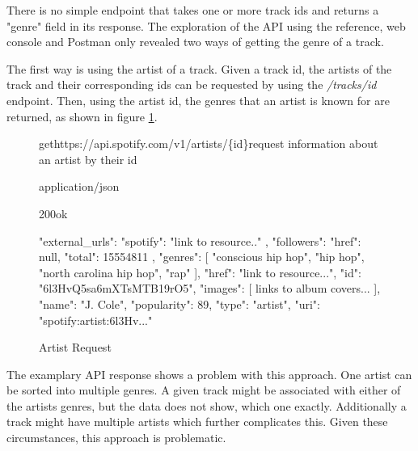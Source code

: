 There is no simple endpoint that takes one or more track ids and returns  a "genre" field
in its response. The exploration of the API using the reference, web console and Postman only revealed
two ways of getting the genre of a track. 

The first way is using the artist of a track. Given a track id, the artists of the track and their corresponding
ids can be requested by using the \emph{/tracks/{id}} endpoint. Then, using the artist id, the genres that an
artist is known for are returned, as shown in figure \ref{fig:Artist Request}.

\begin{figure}[H]
    \caption{Artist Request}
	\label{fig:Artist Request}
\begin{apiRoute}{get}{https://api.spotify.com/v1/artists/\{id\}}{request information about an artist by their id}
    \begin{routeParameter}
    \end{routeParameter}
    \begin{routeResponse}{application/json}
        \begin{routeResponseItem}{200}{ok}
            \begin{routeResponseItemBody}
{
    "external_urls": {
        "spotify": "link to resource.."
    },
    "followers": {
        "href": null,
        "total": 15554811
    },
    "genres": [
        "conscious hip hop",
        "hip hop",
        "north carolina hip hop",
        "rap"
    ],
    "href": "link to resource...",
    "id": "6l3HvQ5sa6mXTsMTB19rO5",
    "images": [ links to album covers... ],
    "name": "J. Cole",
    "popularity": 89,
    "type": "artist",
    "uri": "spotify:artist:6l3Hv..."
}
            \end{routeResponseItemBody}
        \end{routeResponseItem}
    \end{routeResponse}
\end{apiRoute}
\end{figure}

The examplary API response shows a problem with this approach. One artist can be sorted
into multiple genres.
A given track might be associated with either of the artists genres, but the data does
not show, which one exactly.
Additionally a track might have multiple artists which further complicates this.
Given these circumstances, this approach is problematic.

